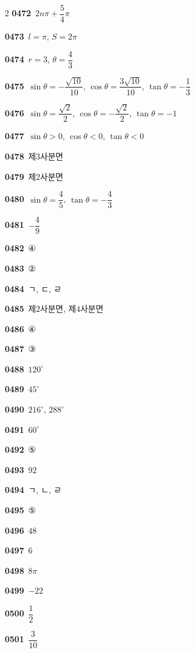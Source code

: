 \documentclass[10pt,a4paper]{article}
\begin{document}
\begin{multicols}{2}
\noindent\textbf{0472}\ $2n\pi+\dfrac{5}{4}\pi$\par
\noindent\textbf{0473}\ $l=\pi$, $S=2\pi$\par
\noindent\textbf{0474}\ $r=3$, $\theta=\dfrac{4}{3}$\par
\noindent\textbf{0475}\ $\sin\theta=-\dfrac{\sqrt{10}}{10}$, $\cos\theta=\dfrac{3\sqrt{10}}{10}$, $\tan\theta=-\dfrac{1}{3}$\par
\noindent\textbf{0476}\ $\sin\theta=\dfrac{\sqrt{2}}{2}$, $\cos\theta=-\dfrac{\sqrt{2}}{2}$, $\tan\theta=-1$\par
\noindent\textbf{0477}\ $\sin\theta>0$, $\cos\theta<0$, $\tan\theta<0$\par
\noindent\textbf{0478}\ 제$3$사분면\par
\noindent\textbf{0479}\ 제$2$사분면\par
\noindent\textbf{0480}\ $\sin\theta=\dfrac{4}{5}$, $\tan\theta=-\dfrac{4}{3}$\par
\noindent\textbf{0481}\ $-\dfrac{4}{9}$\par
\noindent\textbf{0482}\ ④\par
\noindent\textbf{0483}\ ②\par
\noindent\textbf{0484}\ ㄱ, ㄷ, ㄹ\par
\noindent\textbf{0485}\ 제$2$사분면, 제$4$사분면\par
\noindent\textbf{0486}\ ④\par
\noindent\textbf{0487}\ ③\par
\noindent\textbf{0488}\ $120^\circ$\par
\noindent\textbf{0489}\ $45^\circ$\par
\noindent\textbf{0490}\ $216^\circ$, $288^\circ$\par
\noindent\textbf{0491}\ $60^\circ$\par
\noindent\textbf{0492}\ ⑤\par
\noindent\textbf{0493}\ $92$\par
\noindent\textbf{0494}\ ㄱ, ㄴ, ㄹ\par
\noindent\textbf{0495}\ ⑤\par
\noindent\textbf{0496}\ $48$\par
\noindent\textbf{0497}\ $6$\par
\noindent\textbf{0498}\ $8\pi$\par
\noindent\textbf{0499}\ $-22$\par
\noindent\textbf{0500}\ $\dfrac{1}{2}$\par
\noindent\textbf{0501}\ $\dfrac{3}{10}$\par

\end{multicols}
\end{document}
